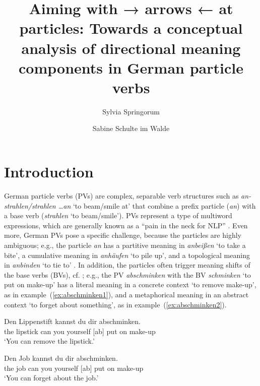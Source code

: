 \documentclass[output=paper]{langsci/langscibook}
\title{Aiming with → arrows ← at
  particles: Towards a conceptual analysis of directional meaning
  components in German particle verbs}
\author{%
  Sylvia Springorum\affiliation{Institut für Maschinelle Sprachverarbeitung, Universität Stuttgart}\and 
  Sabine Schulte im Walde\affiliation{Institut für Maschinelle Sprachverarbeitung, Universität Stuttgart}
}
\begin{document}
\maketitle


\clearpage
\section{Introduction}

German particle verbs (PVs) are complex, separable verb structures such as
\textit{an- strahlen/strahlen \ldots an} `to beam/smile at' that combine a prefix particle
(\textit{an}) with a base verb (\textit{strahlen} `to
beam/smile'). PVs
represent a type of multiword expressions, which are generally known
as a ``pain in the neck for NLP'' \citep{SagEtAl:02}. Even
more, German PVs pose a specific challenge, because the particles are
highly ambiguous; e.g., the particle \textit{an} has a partitive
meaning in \textit{anbeißen} `to take a bite', a cumulative meaning in
\textit{anhäufen} `to pile up', and a topological meaning in
\textit{anbinden} `to tie to' \citep{Springorum:11}. In addition, the
particles often trigger meaning shifts of the base verbs (BVs),
cf. \citet{SpringorumEtAl:13,FrassinelliEtAl:17,Koeper/SchulteImWalde:18,SchulteImWaldeEtAl:18};
e.g., the PV \textit{abschminken} with the BV \textit{schminken} `to
put on make-up' has a literal meaning in a concrete context `to
remove make-up', as in example~(\ref{ex:abschminken1}), and a
metaphorical meaning in an abstract context `to forget about
something', as in example~(\ref{ex:abschminken2}).

\ea\label{ex:abschminken1}
\gll Den Lippenstift kannst du dir abschminken.\\
the lipstick can you yourself {[ab] put on make-up}\\
\glt `You can remove the lipstick.'
\z

\ea\label{ex:abschminken2}
\gll Den Job kannst du dir abschminken.\\
the job can you yourself {[ab] put on make-up}\\
\glt `You can forget about the job.'
\z

%
\end{document}
